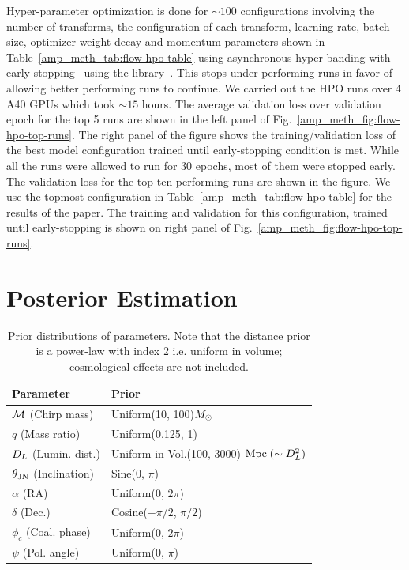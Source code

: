 \begin{refsection}
Hyper-parameter optimization is done for $\sim 100$ configurations involving the number of transforms, the configuration of each transform, learning rate, batch size, optimizer
weight decay and momentum parameters shown in Table~\ref{amp_meth_tab:flow-hpo-table} using asynchronous hyper-banding with early stopping~\cite{li2018massively} using the {\raytune} library~\cite{liaw2018tune}.
This stops under-performing runs in favor of allowing better performing runs to continue. We carried out the HPO runs over 4 A40 GPUs which took $\sim 15$ hours. 
The average validation loss over validation epoch for the top 5 runs are shown in the left panel of Fig.~\ref{amp_meth_fig:flow-hpo-top-runs}.
The right panel of the figure shows the training/validation loss of the best model configuration trained until early-stopping condition is met.
While all the runs were allowed to run for 30 epochs, most of them were stopped early. The validation loss for the top ten performing runs are shown in the figure.
We use the topmost configuration in Table~\ref{amp_meth_tab:flow-hpo-table} for the results of the paper. 
The training and validation for this configuration, trained until early-stopping is shown on right panel of Fig.~\ref{amp_meth_fig:flow-hpo-top-runs}.


\section{Posterior Estimation}
\label{amp_meth_sec:estimation}

\begin{table}
\caption[Prior distributions of parameters used to train \amplfi]{Prior distributions of parameters.
Note that the distance prior is a power-law with index 2 i.e. uniform in volume; cosmological effects are not included.}
\centering
\begin{tabular}{ll}
\hline
Parameter & Prior \\
\hline\hline
$\mathcal{M}$ \hfill (Chirp mass) & Uniform(10, 100)$M_{\odot}$ \\
$q$ \hfill (Mass ratio) & Uniform(0.125, 1) \\
$D_L$ \hfill (Lumin. dist.) & Uniform in Vol.(100, 3000) $\mathrm{Mpc}\;(\sim D_L^2)$ \\
$\theta_{\mathrm{JN}}$ \hfill (Inclination) & Sine(0, $\pi$) \\
$\alpha$ \hfill (RA) & Uniform(0, $2\pi$)\\
$\delta$ \hfill (Dec.) & Cosine($-\pi/2$, $\pi/2$) \\
$\phi_c$ \hfill (Coal. phase) & Uniform(0, $2\pi$) \\
$\psi$ \hfill (Pol. angle) & Uniform(0, $\pi$)\\ 
\hline
\end{tabular}
\label{amp_meth_tab:priors}
\end{table}


\end{refsection}
